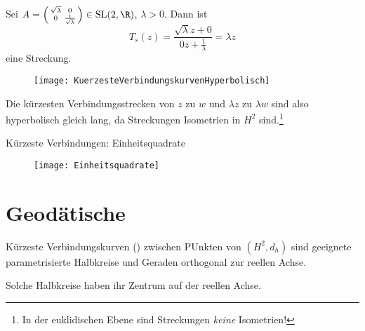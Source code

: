 \begin{remark}
  \
  \begin{enumerate}

    \begin{minipage}{.6\textwidth}
      \item Sei \( A = \left( \begin{smallmatrix}
        \sqrt{\lambda} & 0 \\ 0 & \frac{1}{\sqrt{\lambda}}
      \end{smallmatrix} \right) \in \text{SL}(2,\R) \), \( \lambda > 0 \). Dann ist
      \begin{equation*}
        T_s(z) = \frac{\sqrt{\lambda}z + 0}{0z + \frac{1}{\lambda}} = \lambda z
      \end{equation*}
      eine Streckung.
      \vspace{1em}
    \end{minipage}
    \hfill
    \begin{minipage}{.375\textwidth}
      \begin{figure}[H]
        \texttt{[image: KuerzesteVerbindungskurvenHyperbolisch]}
      \end{figure}
    \end{minipage}
    Die kürzesten Verbindungsstrecken von \( z \) zu \( w \) und \( \lambda z \) zu \( \lambda w \) sind also hyperbolisch gleich lang, da Streckungen Isometrien in \( H^2 \) sind.\footnote{In der euklidischen Ebene sind Streckungen \emph{keine} Isometrien!}


    \item Kürzeste Verbindungen: Einheitsquadrate
    \begin{figure}[H]
      \texttt{[image: Einheitsquadrate]}
    \end{figure}
  \end{enumerate}
\end{remark}

\section{Geodätische}

\begin{theorem}[Geodätische]
  Kürzeste Verbindungskurven () zwischen PUnkten von \( (H^2, d_h) \) sind geeignete parametrisierte Halbkreise und Geraden orthogonal zur reellen Achse.

  Solche Halbkreise haben ihr Zentrum auf der reellen Achse.
\end{theorem}

